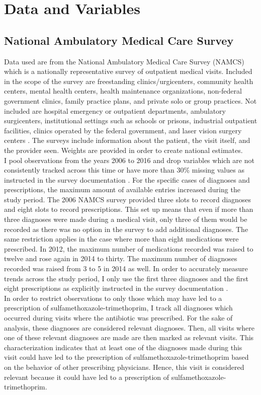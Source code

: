 \chapter{Data and Variables}

\section{National Ambulatory Medical Care Survey}
Data used are from the National Ambulatory Medical Care Survey (NAMCS) which is a nationally representative survey of outpatient medical visits. Included in the scope of the survey are freestanding clinics/urgicenters, community health centers, mental health centers, health maintenance organizations,  non-federal government clinics, family practice plans, and private solo or group practices. Not included are hospital emergency or outpatient departments, ambulatory surgicenters, institutional settings such as schools or prisons, industrial outpatient facilities, clinics operated by the federal government, and laser vision surgery centers \cite{hing_basic_nodate}. The surveys include information about the patient, the visit itself, and the provider seen. Weights are provided in order to create national estimates.\\
\indent I pool observations from the years 2006 to 2016 and drop variables which are not consistently tracked across this time or have more than 30\% missing values as instructed in the survey documentation \cite{myrick_understanding_nodate}. For the specific cases of diagnoses and prescriptions, the maximum amount of available entries increased during the study period. The 2006 NAMCS survey provided three slots to record diagnoses and eight slots to record prescriptions. This set up means that even if more than three diagnoses were made during a medical visit, only three of them would be recorded as there was no option in the survey to add additional diagnoses. The same restriction applies in the case where more than eight medications were prescribed. In 2012, the maximum number of medications recorded was raised to twelve and rose again in 2014 to thirty. The maximum number of diagnoses recorded was raised from 3 to 5 in 2014 as well. In order to accurately measure trends across the study period, I only use the first three diagnoses and the first eight prescriptions as explicitly instructed in the survey documentation \cite{schappert_analyzing_nodate}.\\
\indent In order to restrict observations to only those which may have led to a prescription of sulfamethoxazole-trimethoprim, I track all diagnoses which occurred during visits where the antibiotic was prescribed. For the sake of analysis, these diagnoses are considered relevant diagnoses. Then, all visits where one of these relevant diagnoses are made are then marked as relevant visits. This characterization indicates that at least one of the diagnoses made during this visit could have led to the prescription of sulfamethoxazole-trimethoprim based on the behavior of other prescribing physicians. Hence, this visit is considered relevant because it could have led to a prescription of sulfamethoxazole-trimethoprim.\\
